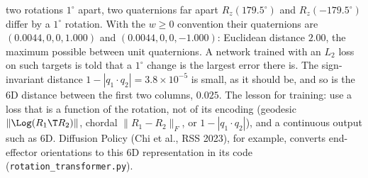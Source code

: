 \begin{example}{two rotations $1^\circ$ apart, two quaternions far apart}
$R_z(179.5^\circ)$ and $R_z(-179.5^\circ)$ differ by a $1^\circ$ rotation. With the $w\ge0$ convention their quaternions are $(0.0044,0,0,1.000)$ and $(0.0044,0,0,-1.000)$: Euclidean distance $2.00$, the maximum possible between unit quaternions. A network trained with an $L_2$ loss on such targets is told that a $1^\circ$ change is the largest error there is. The sign-invariant distance $1-|q_1\cdot q_2|=3.8\times10^{-5}$ is small, as it should be, and so is the 6D distance between the first two columns, $0.025$. The lesson for training: use a loss that is a function of the rotation, not of its encoding (geodesic $\|\Log(R_1\T R_2)\|$, chordal $\|R_1-R_2\|_F$, or $1-|q_1\cdot q_2|$), and a continuous output such as 6D. Diffusion Policy (Chi et al., RSS 2023), for example, converts end-effector orientations to this 6D representation in its code (\texttt{rotation\_transformer.py}).
\end{example}
